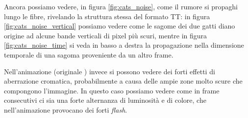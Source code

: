 \documentclass[11pt,a4paper]{article}
\begin{document}
Ancora possiamo vedere, in figura \ref{fig:cats_noise}, come il rumore  si propaghi lungo le fibre, rivelando la struttura stessa del formato TT: in figura \ref{fig:cats_noise_vertical} possiamo vedere come le sagome dei due gatti diano origine ad alcune bande verticali di pixel più scuri, mentre in figura \ref{fig:cats_noise_time} si veda in basso a destra la propagazione nella dimensione temporale di una sagoma proveniente da un altro frame.

Nell'animazione \href{http://poisson.phc.unipi.it/~bianucci/shared/tesi/muhammad_ali_TT.gif}{} (originale \href{http://poisson.phc.unipi.it/~bianucci/shared/tesi/muhammad_ali.gif}{}) invece si possono vedere dei forti effetti di aberrazione cromatica, probabilmente a causa delle ampie zone molto scure che compongono l'immagine. In questo caso possiamo vedere come in frame consecutivi ci sia una forte alternanza di luminosità e di colore, che nell'animazione provocano dei forti \emph{flash}.
\end{document}
